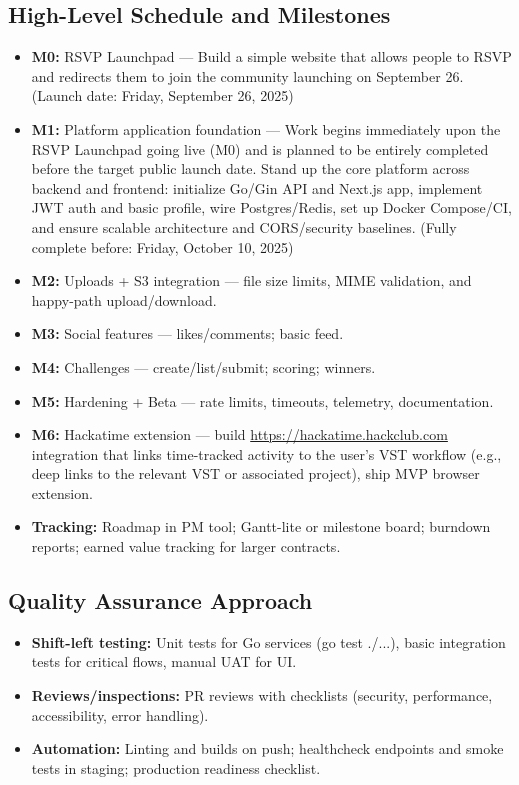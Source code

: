 \documentclass[12pt,a4paper]{article}
\begin{document}
\subsection{High-Level Schedule and Milestones}
\begin{itemize}
\item \textbf{M0:} RSVP Launchpad --- Build a simple website that allows people to RSVP and redirects them to join the community launching on September 26. (Launch date: Friday, September 26, 2025)
\item \textbf{M1:} Platform application foundation --- Work begins immediately upon the RSVP Launchpad going live (M0) and is planned to be entirely completed before the target public launch date. Stand up the core platform across backend and frontend: initialize Go/Gin API and Next.js app, implement JWT auth and basic profile, wire Postgres/Redis, set up Docker Compose/CI, and ensure scalable architecture and CORS/security baselines. (Fully complete before: Friday, October 10, 2025)
\item \textbf{M2:} Uploads + S3 integration --- file size limits, MIME validation, and happy-path upload/download.
\item \textbf{M3:} Social features --- likes/comments; basic feed.
\item \textbf{M4:} Challenges --- create/list/submit; scoring; winners.
\item \textbf{M5:} Hardening + Beta --- rate limits, timeouts, telemetry, documentation.
\item \textbf{M6:} Hackatime extension --- build \url{https://hackatime.hackclub.com} integration that links time-tracked activity to the user's VST workflow (e.g., deep links to the relevant VST or associated project), ship MVP browser extension.
\item \textbf{Tracking:} Roadmap in PM tool; Gantt-lite or milestone board; burndown reports; earned value tracking for larger contracts.
\end{itemize}

\subsection{Quality Assurance Approach}
\begin{itemize}
\item \textbf{Shift-left testing:} Unit tests for Go services (go test ./...), basic integration tests for critical flows, manual UAT for UI.
\item \textbf{Reviews/inspections:} PR reviews with checklists (security, performance, accessibility, error handling).
\item \textbf{Automation:} Linting and builds on push; healthcheck endpoints and smoke tests in staging; production readiness checklist.
\end{itemize}
\end{document}
